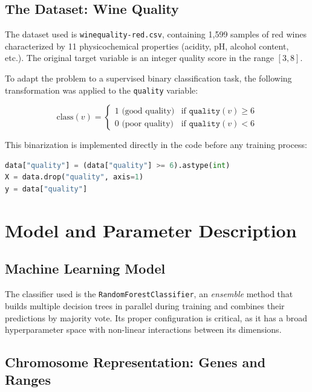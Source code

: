 \documentclass[12pt, a4paper]{article}
\begin{document}
\subsection{The Dataset: Wine Quality}

The dataset used is \texttt{winequality-red.csv}, containing 1,599 samples of
red wines characterized by 11 physicochemical properties (acidity, pH, alcohol content,
etc.). The original target variable is an integer quality score in the range $[3, 8]$.

To adapt the problem to a supervised binary classification task, the following
transformation was applied to the \texttt{quality} variable:

\begin{equation}
  \text{class}(v) =
  \begin{cases}
    1 \text{ (good quality)} & \text{if } \texttt{quality}(v) \geq 6 \\
    0 \text{ (poor quality)}  & \text{if } \texttt{quality}(v) < 6
  \end{cases}
\end{equation}

This binarization is implemented directly in the code before any training process:

\begin{lstlisting}[language=Python, caption={Binary transformation of the target variable}]
data["quality"] = (data["quality"] >= 6).astype(int)
X = data.drop("quality", axis=1)
y = data["quality"]
\end{lstlisting}

\section{Model and Parameter Description}

\subsection{Machine Learning Model}

The classifier used is the \texttt{RandomForestClassifier}, an \textit{ensemble} method
that builds multiple decision trees in parallel during training and combines their
predictions by majority vote. Its proper configuration is critical, as it has a broad
hyperparameter space with non-linear interactions between its dimensions.

\subsection{Chromosome Representation: Genes and Ranges}
\end{document}
